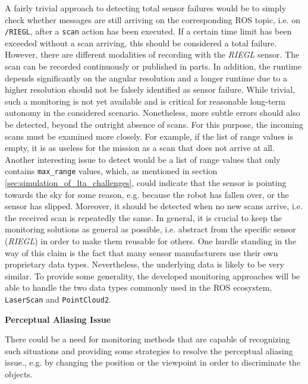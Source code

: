 \documentclass[english, master, utf8]{base/thesis_KBS}
\newcommand{\code}[1]{\colorbox{light-gray}{\texttt{#1}}}
\begin{document}
\noindent
A fairly trivial approach to detecting total sensor failures would be to simply check whether messages are still arriving on the corresponding ROS topic,
i.e. on \code{/RIEGL}, after a \code{scan} action has been executed. If a certain time limit has been exceeded without a scan arriving, this should be considered a total failure.
However, there are different modalities of recording with the \textit{RIEGL} sensor. The scan can be recorded continuously or published in parts.
In addition, the runtime depends significantly on the angular resolution and a longer runtime due to a higher resolution should not be falsely identified as sensor failure.
While trivial, such a monitoring is not yet available and is critical for reasonable long-term autonomy in the considered scenario.
Nonetheless, more subtle errors should also be detected, beyond the outright absence of scans. For this purpose, the incoming scans must be examined more closely. For example, 
if the list of range values is empty, it is as useless for the mission as a scan that does not arrive at all. Another interesting issue to detect would be a list of range values
that only contains \code{max\_range} values, which, as mentioned in section \ref{sec:simulation_of_lta_challenges}, could indicate that the sensor is pointing towards the sky for some reason, 
e.g. because the robot has fallen over, or the sensor has slipped. Moreover, it should be detected when no new scans arrive, i.e. the received scan is repeatedly the same.
In general, it is crucial to keep the monitoring solutions as general as possible, i.e. abstract from the specific sensor (\textit{RIEGL}) in order to make them reusable for others.
One hurdle standing in the way of this claim is the fact that many sensor manufacturers use their own proprietary data types. Nevertheless, the underlying data is likely to be 
very similar. To provide some generality, the developed monitoring approaches will be able to handle the two data types commonly used in the ROS ecosystem, 
\code{LaserScan} and \code{PointCloud2}.\newline

\noindent
\textbf{Perceptual Aliasing Issue}\newline

\noindent
There could be a need for monitoring methods that are capable of recognizing such situations and providing some strategies to resolve the 
perceptual aliasing issue., e.g. by changing the position or the viewpoint in order to discriminate the objects.\newline
\end{document}

